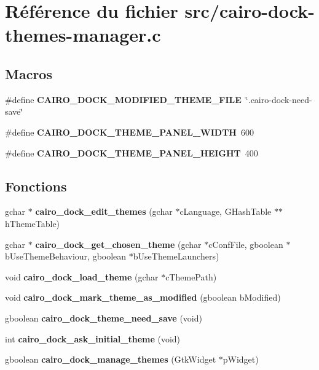 \section{R\'{e}f\'{e}rence du fichier src/cairo-dock-themes-manager.c}
\label{cairo-dock-themes-manager_8c}
\subsection*{Macros}
\begin{CompactItemize}
\item 
\#define {\bf CAIRO\_\-DOCK\_\-MODIFIED\_\-THEME\_\-FILE}~\char`\"{}.cairo-dock-need-save\char`\"{}
\item 
\#define {\bf CAIRO\_\-DOCK\_\-THEME\_\-PANEL\_\-WIDTH}~600
\item 
\#define {\bf CAIRO\_\-DOCK\_\-THEME\_\-PANEL\_\-HEIGHT}~400
\end{CompactItemize}
\subsection*{Fonctions}
\begin{CompactItemize}
\item 
gchar $\ast$ {\bf cairo\_\-dock\_\-edit\_\-themes} (gchar $\ast$c\-Language, GHash\-Table $\ast$$\ast$h\-Theme\-Table)
\item 
gchar $\ast$ {\bf cairo\_\-dock\_\-get\_\-chosen\_\-theme} (gchar $\ast$c\-Conf\-File, gboolean $\ast$b\-Use\-Theme\-Behaviour, gboolean $\ast$b\-Use\-Theme\-Launchers)
\item 
void {\bf cairo\_\-dock\_\-load\_\-theme} (gchar $\ast$c\-Theme\-Path)
\item 
void {\bf cairo\_\-dock\_\-mark\_\-theme\_\-as\_\-modified} (gboolean b\-Modified)
\item 
gboolean {\bf cairo\_\-dock\_\-theme\_\-need\_\-save} (void)
\item 
int {\bf cairo\_\-dock\_\-ask\_\-initial\_\-theme} (void)
\item 
gboolean {\bf cairo\_\-dock\_\-manage\_\-themes} (Gtk\-Widget $\ast$p\-Widget)
\end{CompactItemize}
